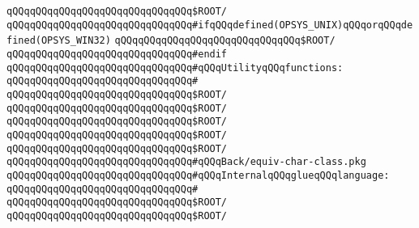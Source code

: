 \verb|qQQqqQQqqQQqqQQqqQQqqQQqqQQqqQQq$ROOT/|\newline
\newline
\newline
\verb|qQQqqQQqqQQqqQQqqQQqqQQqqQQqqQQq#ifqQQqdefined(OPSYS_UNIX)qQQqorqQQqdefined(OPSYS_WIN32)|\newline
\verb|qQQqqQQqqQQqqQQqqQQqqQQqqQQqqQQq$ROOT/|\newline
\verb|qQQqqQQqqQQqqQQqqQQqqQQqqQQqqQQq#endif|\newline
\newline
\verb|qQQqqQQqqQQqqQQqqQQqqQQqqQQqqQQq#qQQqUtilityqQQqfunctions:|\newline
\verb|qQQqqQQqqQQqqQQqqQQqqQQqqQQqqQQq#|\newline
\verb|qQQqqQQqqQQqqQQqqQQqqQQqqQQqqQQq$ROOT/|\newline
\verb|qQQqqQQqqQQqqQQqqQQqqQQqqQQqqQQq$ROOT/|\newline
\verb|qQQqqQQqqQQqqQQqqQQqqQQqqQQqqQQq$ROOT/|\newline
\verb|qQQqqQQqqQQqqQQqqQQqqQQqqQQqqQQq$ROOT/|\newline
\verb|qQQqqQQqqQQqqQQqqQQqqQQqqQQqqQQq$ROOT/|\newline
\verb|qQQqqQQqqQQqqQQqqQQqqQQqqQQqqQQq#qQQqBack/equiv-char-class.pkg|\newline
\newline
\verb|qQQqqQQqqQQqqQQqqQQqqQQqqQQqqQQq#qQQqInternalqQQqglueqQQqlanguage:|\newline
\verb|qQQqqQQqqQQqqQQqqQQqqQQqqQQqqQQq#|\newline
\verb|qQQqqQQqqQQqqQQqqQQqqQQqqQQqqQQq$ROOT/|\newline
\verb|qQQqqQQqqQQqqQQqqQQqqQQqqQQqqQQq$ROOT/|\newline
